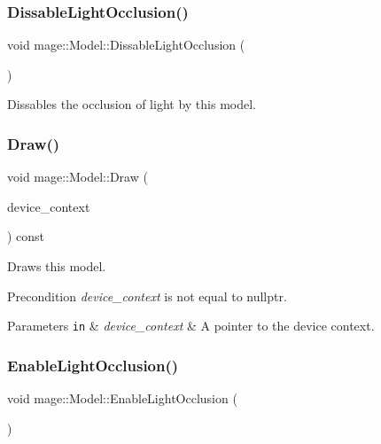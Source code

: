 \subsubsection{\texorpdfstring{Dissable\+Light\+Occlusion()}{DissableLightOcclusion()}}
{\footnotesize\ttfamily void mage\+::\+Model\+::\+Dissable\+Light\+Occlusion (\begin{DoxyParamCaption}{ }\end{DoxyParamCaption})\hspace{0.3cm}{\ttfamily [noexcept]}}

Dissables the occlusion of light by this model. \hypertarget{classmage_1_1_model_aa0358375a2906b24ce4f3e0ddc4cdd01}{}\label{classmage_1_1_model_aa0358375a2906b24ce4f3e0ddc4cdd01} 
\subsubsection{\texorpdfstring{Draw()}{Draw()}}
{\footnotesize\ttfamily void mage\+::\+Model\+::\+Draw (\begin{DoxyParamCaption}\item[{I\+D3\+D11\+Device\+Context4 $\ast$}]{device\+\_\+context }\end{DoxyParamCaption}) const\hspace{0.3cm}{\ttfamily [noexcept]}}

Draws this model.

\begin{DoxyPrecond}{Precondition}
{\itshape device\+\_\+context} is not equal to {\ttfamily nullptr}. 
\end{DoxyPrecond}

\begin{DoxyParams}[1]{Parameters}
\mbox{\tt in}  & {\em device\+\_\+context} & A pointer to the device context. \\
\hline
\end{DoxyParams}
\hypertarget{classmage_1_1_model_a5fd5e62a3365810d84af4cf9c202a9fa}{}\label{classmage_1_1_model_a5fd5e62a3365810d84af4cf9c202a9fa} 
\subsubsection{\texorpdfstring{Enable\+Light\+Occlusion()}{EnableLightOcclusion()}}
{\footnotesize\ttfamily void mage\+::\+Model\+::\+Enable\+Light\+Occlusion (\begin{DoxyParamCaption}{ }\end{DoxyParamCaption})\hspace{0.3cm}{\ttfamily [noexcept]}}

